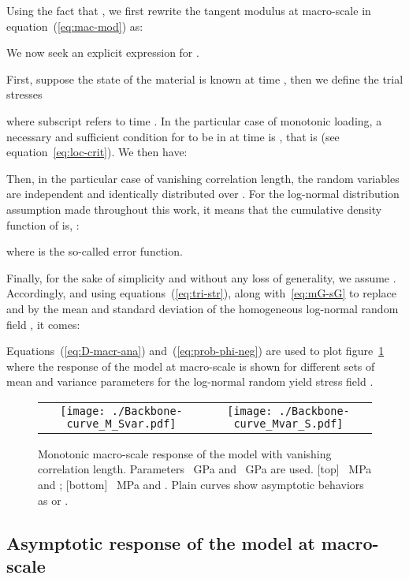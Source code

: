 \documentclass[12p]{amsart}
\begin{document}
Using the fact that , we first rewrite the tangent modulus at macro-scale in equation~(\ref{eq:mac-mod}) as:

We now seek an explicit expression for .

First, suppose the state of the material is known at time , then we define the trial stresses

where subscript  refers to time . In the particular case of monotonic loading, a necessary and sufficient condition for  to be in  at time  is , that is  (see equation~\ref{eq:loc-crit}). We then have:


Then, in the particular case of vanishing correlation length, the random variables  are independent and identically distributed over . For the log-normal distribution assumption made throughout this work, it means that the cumulative density function of  is, : 

where  is the so-called error function.

Finally, for the sake of simplicity and without any loss of generality, we assume . Accordingly, and using equations~(\ref{eq:tri-str}), along with~\eqref{eq:mG-sG} to replace  and  by the mean  and standard deviation  of the homogeneous log-normal random field , it comes:


Equations~(\ref{eq:D-macr-ana}) and~(\ref{eq:prob-phi-neg}) are used to plot figure~\ref{fig:axial-loading} where the response of the model at macro-scale is shown for different sets of mean and variance parameters for the log-normal random yield stress field .

\begin{figure}[h]
\begin{center}
 \begin{tabular}{cc}
 \texttt{[image: ./Backbone-curve\_M\_Svar.pdf]} & \texttt{[image: ./Backbone-curve\_Mvar\_S.pdf]}
 \end{tabular}
\caption{Monotonic macro-scale response of the model with vanishing correlation length. Parameters ~GPa and ~GPa are used. [top] ~MPa and ; [bottom] ~MPa and . Plain curves show asymptotic behaviors as  or .}
\label{fig:axial-loading}
\end{center}
\end{figure}


\subsection{Asymptotic response of the model at macro-scale}
\end{document}
